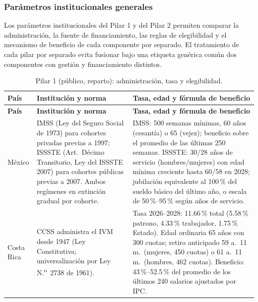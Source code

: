 \documentclass[12pt, letterpaper]{article}
\begin{document}
\subsubsection*{Parámetros institucionales generales}

Los parámetros institucionales del Pilar 1 y del Pilar 2 permiten comparar la administración, la fuente de financiamiento, las reglas de elegibilidad y el mecanismo de beneficio de cada componente por separado. El tratamiento de cada pilar por separado evita fusionar bajo una etiqueta genérica común dos componentes con gestión y financiamiento distintos.

\begin{xltabular}{\textwidth}{P{1.7cm}Y Y}
\caption{Pilar 1 (público, reparto): administración, tasa y elegibilidad.}
\label{tab:param_pilar1}\\
\toprule
\textbf{País} & \textbf{Institución y norma} & \textbf{Tasa, edad y fórmula de beneficio} \\
\midrule
\endfirsthead

\toprule
\textbf{País} & \textbf{Institución y norma} & \textbf{Tasa, edad y fórmula de beneficio} \\
\midrule
\endhead

\bottomrule
\endfoot

México &
IMSS (Ley del Seguro Social de 1973) para cohortes privadas previas a 1997; ISSSTE (Art.\ Décimo Transitorio, Ley del ISSSTE 2007) para cohortes públicas previas a 2007. Ambos regímenes en extinción gradual por cohorte. &
IMSS: 500 semanas mínimas, 60 años (cesantía) o 65 (vejez); beneficio sobre el promedio de las últimas 250 semanas. ISSSTE: 30/28 años de servicio (hombres/mujeres) con edad mínima creciente hasta 60/58 en 2028; jubilación equivalente al 100\,\% del sueldo básico del último año, o escala de 50\,\%--95\,\% según años de servicio. \\

Costa Rica &
CCSS administra el IVM desde 1947 (Ley Constitutiva; universalización por Ley N.\textsuperscript{o}~2738 de 1961). &
Tasa 2026--2028: 11.66\,\% total (5.58\,\% patrono, 4.33\,\% trabajador, 1.75\,\% Estado). Edad ordinaria 65 años con 300 cuotas; retiro anticipado 59 a.\ 11 m.\ (mujeres, 450 cuotas) o 61 a.\ 11 m.\ (hombres, 462 cuotas). Beneficio: 43\,\%--52.5\,\% del promedio de los últimos 240 salarios ajustados por IPC. \\


\end{xltabular}
\end{document}
